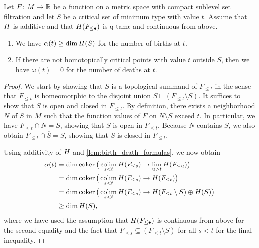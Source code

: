 \begin{lem}
\label{lem:minimum_type_implies_some_birth_and_no_death}
	Let $F \colon M \to \mathbb{R}$ be a function on a metric space with compact sublevel set filtration and let $S$ be a critical set of minimum type with value $t$.
	Assume that $H$ is additive and that $H(F_{\leq \bullet})$ is q-tame and continuous from above.
	\begin{enumerate}
		\item We have $\alpha(t) \geq \dim H(S)$ for the number of births at $t$.
		\item If there are not homotopically critical points with value $t$ outside $S$, then we have $\omega(t) = 0$ for the number of deaths at $t$.
	\end{enumerate}
\end{lem}
\begin{proof}
	We start by showing that $S$ is a topological summand of $F_{\leq t}$ in the sense that $F_{\leq t}$ is homeomorphic to the disjoint union $S \sqcup (F_{\leq t} \setminus S)$.
	It suffices to show that $S$ is open and closed in $F_{\leq t}$.
	By definition, there exists a neighborhood $N$ of $\overline{S}$ in $M$ such that the function values of $F$ on $N \setminus S$ exceed $t$.
	In particular, we have $F_{\leq t} \cap N = S$, showing that $S$ is open in $F_{\leq t}$.
	Because $N$ contains $\overline{S}$, we also obtain $F_{\leq t} \cap \overline{S} = S$, showing that $S$ is closed in $F_{\leq t}$.

	Using additivity of $H$ and \cref{lem:birth_death_formulas}, we now obtain
	\begin{align*}
		\alpha(t) &= \dim \operatorname{coker} \big( \operatorname*{colim}_{s < t} H(F_{\leq s}) \to \lim_{u > t} H(F_{\leq u}) \big) \\
			&= \dim \operatorname{coker} \big( \operatorname*{colim}_{s < t} H(F_{\leq s}) \to H(F_{\leq t}) \big) \\
			&= \dim \operatorname{coker} \big( \operatorname*{colim}_{s < t} H(F_{\leq s}) \to H(F_{\leq t} \setminus S) \oplus H(S) \big) \\
			&\geq \dim H(S),
	\end{align*}
	where we have used the assumption that $H(F_{\leq \bullet})$ is continuous from above for the second equality and the fact that $F_{\leq s} \subseteq (F_{\leq t} \setminus S)$ for all $s < t$ for the final inequality.


\end{proof}
